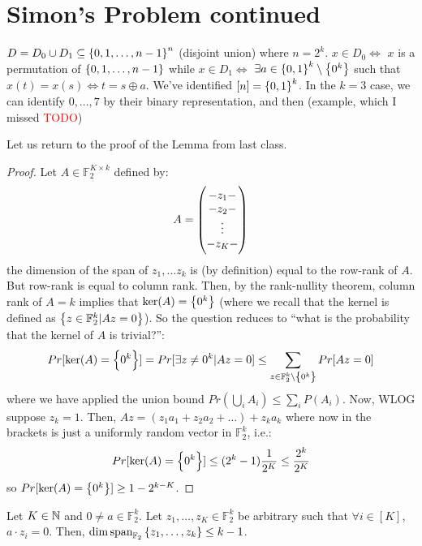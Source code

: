 \section{Simon's Problem continued}
$D = D_0 \cup D_1 \subseteq \set{0, 1, \ldots, n-1}^n$ (disjoint union) where $n = 2^k$. $x \in D_0 \iff$ $x$ is a permutation of $\set{0, 1, \ldots, n-1}$ while $x \in D_1 \iff$ $\exists a \in \set{0, 1}^k \setminus \set{0^k}$ such that $x(t) = x(s) \iff t = s \oplus a$. We've identified $[n] = \set{0, 1}^k$. In the $k = 3$ case, we can identify $0, \ldots, 7$ by their binary representation, and then (example, which I missed \textcolor{red}{TODO})

Let us return to the proof of the Lemma from last class.
\begin{proof}
    Let $A \in \mathbb{F}_2^{K \times k}$ defined by:
    \begin{equation}
        A = \begin{pmatrix}-z_1- \\ -z_2- \\ \vdots \\ -z_K-\end{pmatrix}
    \end{equation}
    the dimension of the span of $z_1, \ldots z_k$ is (by definition) equal to the row-rank of $A$. But row-rank is equal to column rank. Then, by the rank-nullity theorem, column rank of $A = k$ implies that $\text{ker}(A) = \set{0^k}$ (where we recall that the kernel is defined as $\set{z \in \mathbb{F}_2^k \vert Az = 0}$). So the question reduces to ``what is the probability that the kernel of $A$ is trivial?'':
    \begin{equation}
        Pr[\text{ker}(A) = \set{0^k}] = Pr[\exists z \neq 0^k \vert Az = 0] \leq \sum_{z \in \mathbb{F}^k_2 \setminus \set{0^k}}Pr[Az = 0]
    \end{equation}
    where we have applied the union bound $Pr(\bigcup_i A_i) \leq \sum_i P(A_i)$. Now, WLOG suppose $z_k = 1$. Then, $Az = (z_1a_1 + z_2a_2 + \ldots) + z_ka_k$ where now in the brackets is just a uniformly random vector in $\mathbb{F}_2^k$, i.e.:
    \begin{equation}
        Pr[\text{ker}(A) = \set{0^k}] \leq (2^k - 1)\frac{1}{2^K} \leq \frac{2^k}{2^K}
    \end{equation}
    so $Pr[\text{ker}(A) = \set{0^k}] \geq 1 - 2^{k-K}$. 
\end{proof}

\begin{lembox}{}
    Let $K \in \mathbb{N}$ and $0 \neq a \in \mathbb{F}_2^k$. Let $z_1, \ldots, z_K \in \mathbb{F}_2^k$ be arbitrary such that $\forall i \in [K]$, $a \cdot z_i = 0$. Then, $\dim\text{span}_{\mathbb{F}_2}\set{z_1, \ldots, z_k} \leq k - 1$. 
\end{lembox}

